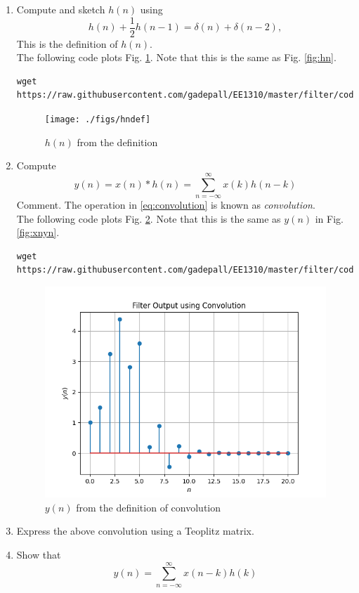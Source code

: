 \documentclass[journal,12pt,twocolumn]{IEEEtran}
\renewcommand\thesection{\arabic{section}}
\begin{document}
\begin{enumerate}[label=\thesection.\arabic*]
\item 
Compute and sketch $h(n)$ using 
\begin{equation}
\label{eq:iir_filter_h}
h(n) + \frac{1}{2}h(n-1) = \delta(n) + \delta(n-2), 
\end{equation}
%
This is the definition of $h(n)$.
\\
\solution The following code plots Fig. \ref{fig:hndef}. Note that this is the same as Fig. 
\ref{fig:hn}. 
%
\begin{lstlisting}
wget https://raw.githubusercontent.com/gadepall/EE1310/master/filter/codes/hndef.py
\end{lstlisting}
\begin{figure}[!ht]
\centering
\texttt{[image: ./figs/hndef]}
\caption{$h(n)$ from the definition}
\label{fig:hndef}
\end{figure}
%
\item Compute 
%
\begin{equation}
\label{eq:convolution}
y(n) = x(n)*h(n) = \sum_{n=-\infty}^{\infty}x(k)h(n-k)
\end{equation}
%
Comment. The operation in \eqref{eq:convolution} is known as
{\em convolution}.
%
\\
\solution The following code plots Fig. \ref{fig:ynconv}. Note that this is the same as 
$y(n)$ in  Fig. 
\ref{fig:xnyn}. 
%
\begin{lstlisting}
wget https://raw.githubusercontent.com/gadepall/EE1310/master/filter/codes/ynconv.py
\end{lstlisting}
\begin{figure}[!ht]
\centering
\includegraphics[width=\columnwidth]{./figs/ynconv}
\caption{$y(n)$ from the definition of convolution}
\label{fig:ynconv}
\end{figure}
\item Express the above convolution using a Teoplitz matrix.

\item Show that
\begin{equation}
y(n) =  \sum_{n=-\infty}^{\infty}x(n-k)h(k)
\end{equation}
\end{enumerate}
\end{document}
